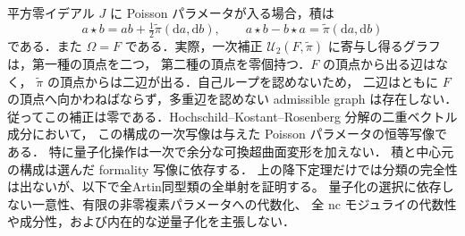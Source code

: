 \begin{remark}[一次項と結論の範囲]
平方零イデアル $J$ に Poisson パラメータが入る場合，積は
\[
 a\star b=ab+\tfrac12\widetilde\pi(\mathrm da,\mathrm db),
 \qquad a\star b-b\star a=\widetilde\pi(\mathrm da,\mathrm db)
\]
である．また $\Omega=F$ である．実際，一次補正
$\mathcal U_2(F,\widetilde\pi)$ に寄与し得るグラフは，第一種の頂点を二つ，
第二種の頂点を零個持つ．$F$ の頂点から出る辺はなく，
$\widetilde\pi$ の頂点からは二辺が出る．自己ループを認めないため，
二辺はともに $F$ の頂点へ向かわねばならず，多重辺を認めない admissible graph は存在しない．
従ってこの補正は零である．Hochschild--Kostant--Rosenberg 分解の二重ベクトル成分において，
この構成の一次写像は与えた Poisson パラメータの恒等写像である．
特に量子化操作は一次で余分な可換超曲面変形を加えない．
積と中心元の構成は選んだ formality 写像に依存する．
上の降下定理だけでは分類の完全性は出ないが、以下で全Artin同型類の全単射を証明する。
量子化の選択に依存しない一意性、有限の非零複素パラメータへの代数化、
全 nc モジュライの代数性や成分性，および内在的な逆量子化を主張しない．
\end{remark}



